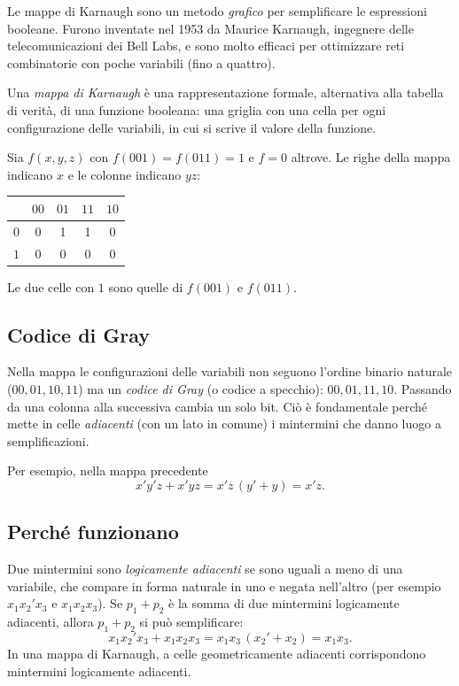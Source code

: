 \documentclass[11pt,a4paper]{article}
\begin{document}
Le mappe di Karnaugh sono un metodo \emph{grafico} per semplificare le espressioni booleane. Furono inventate nel 1953 da Maurice Karnaugh, ingegnere delle telecomunicazioni dei Bell Labs, e sono molto efficaci per ottimizzare reti combinatorie con poche variabili (fino a quattro).

\begin{definizione}
Una \emph{mappa di Karnaugh} è una rappresentazione formale, alternativa alla tabella di verità, di una funzione booleana: una griglia con una cella per ogni configurazione delle variabili, in cui si scrive il valore della funzione.
\end{definizione}

\begin{esempio}
Sia $f(x,y,z)$ con $f(001) = f(011) = 1$ e $f = 0$ altrove. Le righe della mappa indicano $x$ e le colonne indicano $yz$:
\begin{center}
\begin{tabular}{c|cccc}
 & $00$ & $01$ & $11$ & $10$ \\
\midrule
$0$ & 0 & 1 & 1 & 0 \\
$1$ & 0 & 0 & 0 & 0 \\
\end{tabular}
\end{center}
Le due celle con $1$ sono quelle di $f(001)$ e $f(011)$.
\end{esempio}

\subsection{Codice di Gray}

Nella mappa le configurazioni delle variabili non seguono l'ordine binario naturale ($00, 01, 10, 11$) ma un \emph{codice di Gray} (o codice a specchio): $00, 01, 11, 10$. Passando da una colonna alla successiva cambia un solo bit. Ciò è fondamentale perché mette in celle \emph{adiacenti} (con un lato in comune) i mintermini che danno luogo a semplificazioni.

Per esempio, nella mappa precedente
\[
x'y'z + x'yz = x'z\,(y' + y) = x'z.
\]

\subsection{Perché funzionano}

Due mintermini sono \emph{logicamente adiacenti} se sono uguali a meno di una variabile, che compare in forma naturale in uno e negata nell'altro (per esempio $x_1x_2'x_3$ e $x_1x_2x_3$). Se $p_1 + p_2$ è la somma di due mintermini logicamente adiacenti, allora $p_1 + p_2$ si può semplificare:
\[
x_1x_2'x_3 + x_1x_2x_3 = x_1x_3\,(x_2' + x_2) = x_1x_3.
\]
In una mappa di Karnaugh, a celle geometricamente adiacenti corrispondono mintermini logicamente adiacenti.
\end{document}
